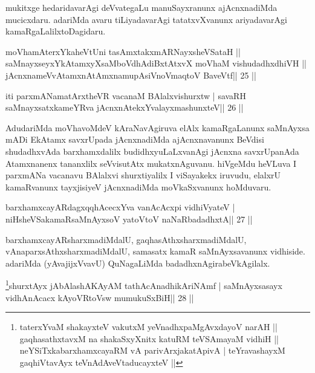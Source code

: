 \begin{artha}
mukitxge hedaridavarAgi deVvategaLu manuSayxranunx ajAcnxnadiMda mucicxdaru. adariMda avaru tiLiyadavarAgi tatatxvXvanunx ariyadavarAgi kamaRgaLalilx\break toDagidaru.
\end{artha}

\begin{shl}
moVhamAterxYkaheVtUni tasAmxtakxmARNayxsheVSataH ||
saMnayxseyxYkAtamxyXsaMboVdhAdiBxtAtxvX moVhaM vishudadhxdhiVH ||
jAcnxnameVvA\s\s tamxnA\s\s tAmxnamupAsiVnoV\s maqtoV BaveVtf\hfill || 25 ||
\end{shl}

\begin{shl}
iti parxmANamatArxtheVR vacanaM BAlalxvishurxtw |
savaRH saMnayxsatxkameYRva jAcnxnAtekxYvalayxmashunxteV\hfill || 26 ||
\end{shl}

\begin{artha}
AdudariMda moVhavoMdeV kAraNavAgiruva elAlx kamaRgaLanunx saMnAyxsa mADi EkAtamx savxrUpada jAcnxnadiMda ajAcnxnavanunx BeVdisi shudadhxvAda barxhamxdalilx budidhxyuLaLxvanAgi jAcnxna savxrUpanAda Atamxnanenx tananxlilx seVvisutAtx mukatxnAguvanu. hiVgeMdu heVLuva I parxmANa vacanavu BAlalxvi shurxtiyalilx I viSayakekx iruvudu, elalxrU kamaRvanunx tayxjisiyeV jAcnxnadiMda moVkaSxvanunx hoMduvaru.
\end{artha}


\begin{shl}
barxhamxcayARdagxqqhAcecxYva vanAcAcxpi vidhiVyateV |
niHsheVSakamaRsaMnAyxsoV yatoV\s toV naNaRbadadhxtA\hfill || 27 ||
\end{shl}

\begin{artha}
barxhamxcayARsharxmadiMdalU, gaqhasAthxsharxmadiMdalU, vAnaparxsAthxsharxmadiMdalU, samasatx kamaR saMnAyxsavanunx vidhiside. adariMda (yAvajijxVvavU) QuNagaLiMda badadhxnAgirabeVkAgilalx.
\end{artha}

\begin{shl}
\footnote{taterxYvaM shakayxteV vakutxM yeV\s nadhxpaMgAvxdayoV narAH || gaqhasathxtavxM na shakaSxyXnitx katuRM teVSAmayaM vidhiH || neYSiTxkabarxhamxcayaRM vA parivArxjakatA\s pivA | teYravashayxM gaqhiVtavAyx teVnAdAveVtaducayxteV ||}shurxtAyx jAbAlashAKAyAM tathAcAnadhikAriNAmf |
saMnAyxsasayx vidhAnAcacx kAyoVR\s toV\s sw mumukuSxBiH\hfill || 28 ||
\end{shl}

